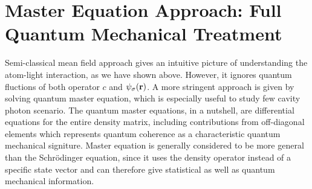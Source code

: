 \documentclass[atoms,article,submit,moreauthors,pdftex,12pt,a4paper]{mdpi}
\begin{document}
\section{Master Equation Approach: Full Quantum Mechanical Treatment } \label{master}

Semi-classical mean field approach gives an intuitive picture of understanding the atom-light interaction, as we have shown above. However, it ignores quantum fluctions of both operator $c$ and $\psi_\sigma({\bf r})$. A more stringent approach is given by solving quantum master equation, which is especially useful to study few cavity photon scenario. The quantum master equations, in a nutshell, are differential equations for the entire density matrix, including contributions from off-diagonal elements which represents quantum coherence as a characteristic quantum mechanical signiture. Master equation is generally considered to be more general than the Schr\"{o}dinger equation, since it uses the density operator instead of a specific state vector and can therefore give statistical as well as quantum mechanical information. 
\end{document}
